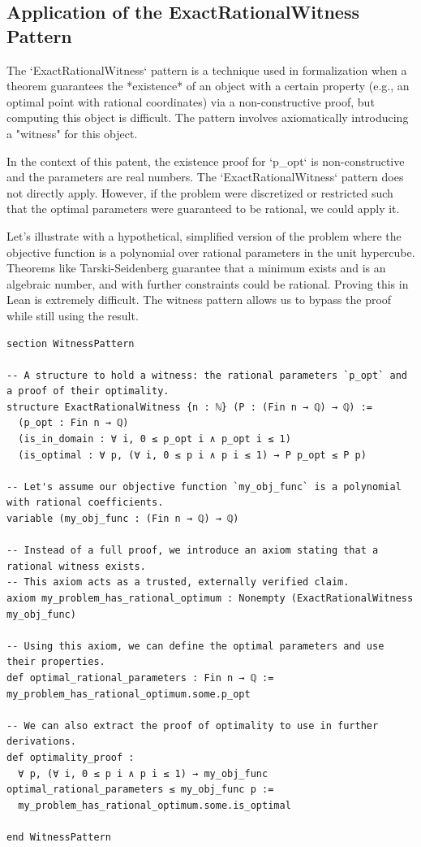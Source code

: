 \documentclass{article}
\begin{document}
\subsection{Application of the ExactRationalWitness Pattern}

The `ExactRationalWitness` pattern is a technique used in formalization when a theorem guarantees the *existence* of an object with a certain property (e.g., an optimal point with rational coordinates) via a non-constructive proof, but computing this object is difficult. The pattern involves axiomatically introducing a "witness" for this object.

In the context of this patent, the existence proof for `p_opt` is non-constructive and the parameters are real numbers. The `ExactRationalWitness` pattern does not directly apply. However, if the problem were discretized or restricted such that the optimal parameters were guaranteed to be rational, we could apply it.

Let's illustrate with a hypothetical, simplified version of the problem where the objective function is a polynomial over rational parameters in the unit hypercube. Theorems like Tarski-Seidenberg guarantee that a minimum exists and is an algebraic number, and with further constraints could be rational. Proving this in Lean is extremely difficult. The witness pattern allows us to bypass the proof while still using the result.

\begin{verbatim}
section WitnessPattern

-- A structure to hold a witness: the rational parameters `p_opt` and a proof of their optimality.
structure ExactRationalWitness {n : ℕ} (P : (Fin n → ℚ) → ℚ) :=
  (p_opt : Fin n → ℚ)
  (is_in_domain : ∀ i, 0 ≤ p_opt i ∧ p_opt i ≤ 1)
  (is_optimal : ∀ p, (∀ i, 0 ≤ p i ∧ p i ≤ 1) → P p_opt ≤ P p)

-- Let's assume our objective function `my_obj_func` is a polynomial with rational coefficients.
variable (my_obj_func : (Fin n → ℚ) → ℚ)

-- Instead of a full proof, we introduce an axiom stating that a rational witness exists.
-- This axiom acts as a trusted, externally verified claim.
axiom my_problem_has_rational_optimum : Nonempty (ExactRationalWitness my_obj_func)

-- Using this axiom, we can define the optimal parameters and use their properties.
def optimal_rational_parameters : Fin n → ℚ := my_problem_has_rational_optimum.some.p_opt

-- We can also extract the proof of optimality to use in further derivations.
def optimality_proof :
  ∀ p, (∀ i, 0 ≤ p i ∧ p i ≤ 1) → my_obj_func optimal_rational_parameters ≤ my_obj_func p :=
  my_problem_has_rational_optimum.some.is_optimal

end WitnessPattern
\end{verbatim}
\end{document}
